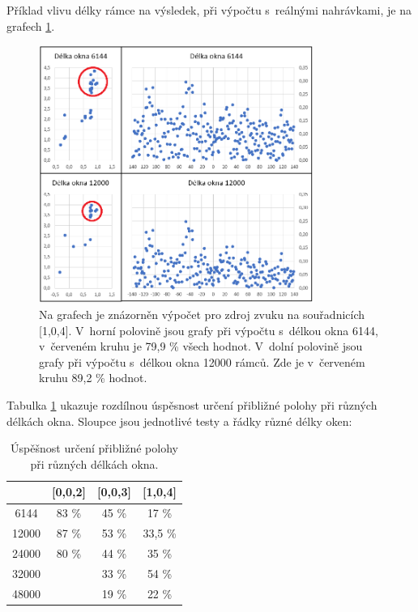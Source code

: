 Příklad vlivu délky rámce na výsledek, při výpočtu s~reálnými nahrávkami, je na grafech \ref{pic:delkaokna}.

\begin{figure}[!ht]
	\centering
	\includegraphics[width=0.8\textwidth]{obrazky-figures/vliv_delky_okna.png}
	\caption{Na grafech je znázorněn výpočet pro zdroj zvuku na souřadnicích [1,0,4]. V~horní polovině jsou grafy při výpočtu s~délkou okna 6144, v~červeném kruhu je 79,9 \% všech hodnot. V~dolní polovině jsou grafy při výpočtu s~délkou okna 12000 rámců. Zde je v~červeném kruhu 89,2 \% hodnot.}
	\label{pic:delkaokna}
\end{figure}

Tabulka \ref{tabulka2} ukazuje rozdílnou úspěsnost určení přibližné polohy při různých délkách okna. Sloupce jsou jednotlivé testy a řádky různé délky oken:

\begin{table}[!h]
    \centering
    \begin{tabular}{||c | c | c | c||} 
 \hline
 & [0,0,2] & [0,0,3] & [1,0,4] \\ [0.5ex] 
 \hline
 6144 & 83 \% & 45 \% & 17 \% \\ 
 \hline
 12000 & 87 \% & 53 \% & 33,5 \% \\
 \hline
 24000 & 80 \% & 44 \% & 35 \% \\
 \hline
 32000 &  & 33 \% & 54 \% \\
 \hline
 48000 &  & 19 \% & 22 \% \\ [1ex] 
 \hline
    \end{tabular}
    \caption{Úspěšnost určení přibližné polohy při různých délkách okna.}
    \label{tabulka2}
\end{table}
\newpage

